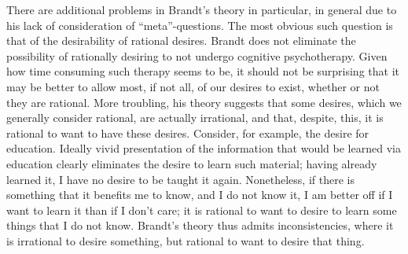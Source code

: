 \documentclass[letterpaper,11pt,twoside]{article}
\begin{document}
    There are additional problems in Brandt's theory in particular, in general due to his lack of consideration of ``meta''-questions.  The most obvious such question is that of the desirability of rational desires.  Brandt does not eliminate the possibility of rationally desiring to not undergo cognitive psychotherapy.  Given how time consuming such therapy seems to be, it should not be surprising that it may be better to allow most, if not all, of our desires to exist, whether or not they are rational.  More troubling, his theory suggests that some desires, which we generally consider rational, are actually irrational, and that, despite, this, it is rational to want to have these desires.  Consider, for example, the desire for education.  Ideally vivid presentation of the information that would be learned via education clearly eliminates the desire to learn such material; having already learned it, I have no desire to be taught it again.  Nonetheless, if there is something that it benefits me to know, and I do not know it, I am better off if I want to learn it than if I don't care; it is rational to want to desire to learn some things that I do not know.  Brandt's theory thus admits inconsistencies, where it is irrational to desire something, but rational to want to desire that thing.
\end{document}
